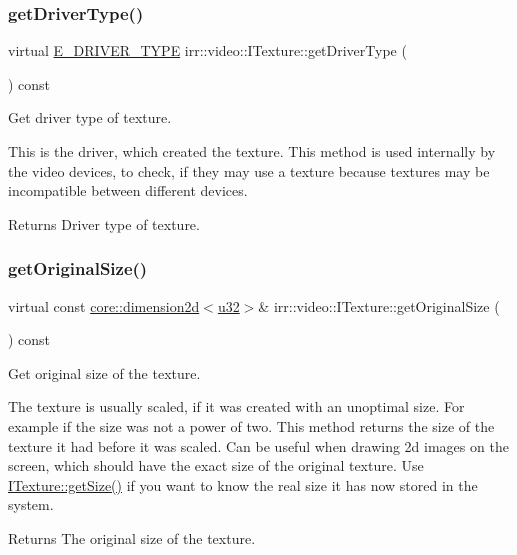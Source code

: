 \subsubsection{\texorpdfstring{get\+Driver\+Type()}{getDriverType()}}
{\footnotesize\ttfamily virtual \hyperlink{namespaceirr_1_1video_ae35a6de6d436c76107ad157fe42356d0}{E\+\_\+\+D\+R\+I\+V\+E\+R\+\_\+\+T\+Y\+PE} irr\+::video\+::\+I\+Texture\+::get\+Driver\+Type (\begin{DoxyParamCaption}{ }\end{DoxyParamCaption}) const\hspace{0.3cm}{\ttfamily [pure virtual]}}



Get driver type of texture. 

This is the driver, which created the texture. This method is used internally by the video devices, to check, if they may use a texture because textures may be incompatible between different devices. \begin{DoxyReturn}{Returns}
Driver type of texture. 
\end{DoxyReturn}
\mbox{\label{classirr_1_1video_1_1ITexture_adbb05bcee8ec7fa11bb4ccfdb725cda8}} 
\subsubsection{\texorpdfstring{get\+Original\+Size()}{getOriginalSize()}}
{\footnotesize\ttfamily virtual const \hyperlink{classirr_1_1core_1_1dimension2d}{core\+::dimension2d}$<$\hyperlink{namespaceirr_a0416a53257075833e7002efd0a18e804}{u32}$>$\& irr\+::video\+::\+I\+Texture\+::get\+Original\+Size (\begin{DoxyParamCaption}{ }\end{DoxyParamCaption}) const\hspace{0.3cm}{\ttfamily [pure virtual]}}



Get original size of the texture. 

The texture is usually scaled, if it was created with an unoptimal size. For example if the size was not a power of two. This method returns the size of the texture it had before it was scaled. Can be useful when drawing 2d images on the screen, which should have the exact size of the original texture. Use \hyperlink{classirr_1_1video_1_1ITexture_adfcf9558c0f1ae543782c03f7903c48e}{I\+Texture\+::get\+Size()} if you want to know the real size it has now stored in the system. \begin{DoxyReturn}{Returns}
The original size of the texture. 
\end{DoxyReturn}
\mbox{\label{classirr_1_1video_1_1ITexture_a14fd1eba217a0dd86b40c4d792ab14ea}} 
